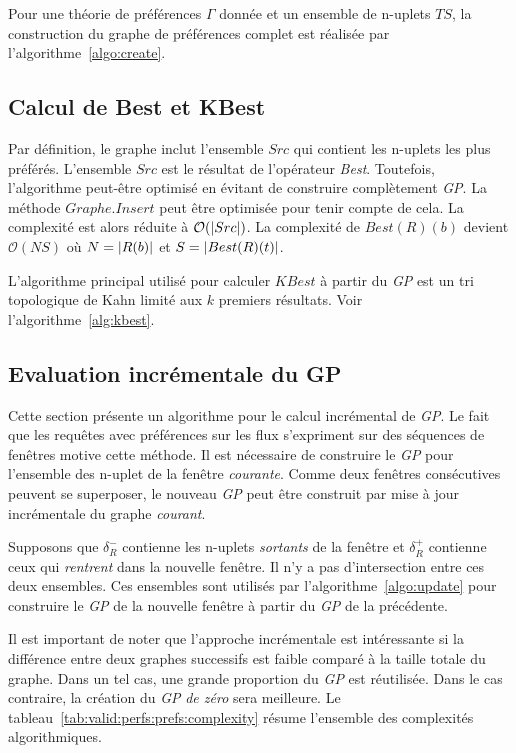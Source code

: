 Pour une théorie de préférences $\Gamma$ donnée et un ensemble de n-uplets $TS$, la construction du graphe de préférences complet est réalisée par l'algorithme~\ref{algo:create}.

\subsection{Calcul de Best et KBest}
Par définition, le graphe inclut l'ensemble $Src$ qui contient les n-uplets les plus préférés. L'ensemble $Src$ est le résultat de l'opérateur \textit{Best}. Toutefois, l'algorithme peut-être optimisé en évitant de construire complètement \textit{GP}. La méthode $Graphe.Insert$ peut être optimisée pour tenir compte de cela. 
La complexité est alors réduite à $\mathcal O(\left| Src \right|)$. La complexité de $Best(R)(b)$ devient $\mathcal O(NS)$ où $N = \left| R(b) \right|$ et $S=\left| Best(R)(t) \right|$.

L'algorithme principal utilisé pour calculer $KBest$ à partir du \textit{GP} est un tri topologique de Kahn limité aux $k$ premiers résultats. Voir l'algorithme~\ref{alg:kbest}.

\subsection{Evaluation incrémentale du GP}
Cette section présente un algorithme pour le calcul incrémental de \textit{GP}. Le fait que les requêtes avec préférences sur les flux s'expriment sur des séquences de fenêtres motive cette méthode. Il est nécessaire de construire le \textit{GP} pour l'ensemble des n-uplet de la fenêtre \textit{courante}. Comme deux fenêtres consécutives peuvent se superposer, le nouveau \textit{GP} peut être construit par mise à jour incrémentale du graphe \textit{courant}. 

Supposons que $\delta_R^{-}$ contienne les n-uplets \textit{sortants} de la fenêtre et $\delta_R^{+}$ contienne ceux qui \textit{rentrent} dans la nouvelle fenêtre. Il n'y a pas d'intersection entre ces deux ensembles. Ces ensembles sont utilisés par l'algorithme~\ref{algo:update} pour construire le \textit{GP} de la nouvelle fenêtre à partir du \textit{GP} de la précédente. 

Il est important de noter que l'approche incrémentale est intéressante si la différence entre deux graphes successifs est faible comparé à la taille totale du graphe. Dans un tel cas, une grande proportion du \textit{GP} est réutilisée. Dans le cas contraire, la création du \textit{GP} \textit{de zéro} sera meilleure. Le tableau~\ref{tab:valid:perfs:prefs:complexity} résume l'ensemble des complexités algorithmiques.

